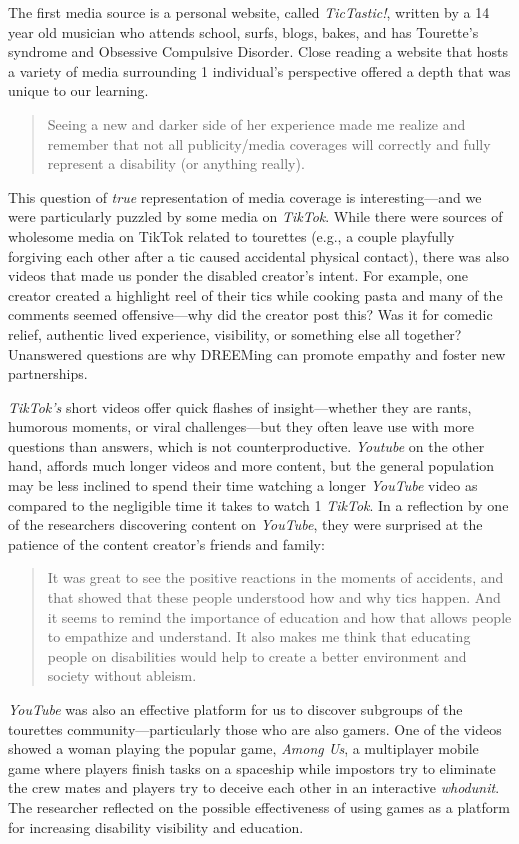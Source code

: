 The first media source is a personal website, called \textit{TicTastic!}, written by a 14 year old musician who attends school, surfs, blogs, bakes, and has Tourette's syndrome and Obsessive Compulsive Disorder. Close reading a website that hosts a variety of media surrounding 1 individual's perspective offered a depth that was unique to our learning.
\begin{quote}
Seeing a new and darker side of her experience made me realize and remember that not all publicity/media coverages will correctly and fully represent a disability (or anything really).
\end{quote}
This question of \textit{true} representation of media coverage is interesting—and we were particularly puzzled by some media on \textit{TikTok}. While there were sources of wholesome media on TikTok related to tourettes (e.g., a couple playfully forgiving each other after a tic caused accidental physical contact), there was also videos that made us ponder the disabled creator's intent. For example, one creator created a highlight reel of their tics while cooking pasta and many of the comments seemed offensive—why did the creator post this? Was it for comedic relief, authentic lived experience, visibility, or something else all together? Unanswered questions are why DREEMing can promote empathy and foster new partnerships. 

\textit{TikTok's} short videos offer quick flashes of insight—whether they are rants, humorous moments, or viral challenges—but they often leave use with more questions than answers, which is not counterproductive. \textit{Youtube} on the other hand, affords much longer videos and more content, but the general population may be less inclined to spend their time watching a longer \textit{YouTube} video as compared to the negligible time it takes to watch 1 \textit{TikTok}. In a reflection by one of the researchers discovering content on \textit{YouTube}, they were surprised at the patience of the content creator's friends and family:
\begin{quote}
It was great to see the positive reactions in the moments of accidents, and that showed that these people understood how and why tics happen. And it seems to remind the importance of education and how that allows people to empathize and understand. It also makes me think that educating people on disabilities would help to create a better environment and society without ableism. 
\end{quote}
\textit{YouTube} was also an effective platform for us to discover subgroups of the tourettes community—particularly those who are also gamers. One of the videos showed a woman playing the popular game, \textit{Among Us}, a multiplayer mobile game where players finish tasks on a spaceship while impostors try to eliminate the crew mates and players try to deceive each other in an interactive \textit{whodunit}. The researcher reflected on the possible effectiveness of using games as a platform for increasing disability visibility and education.

